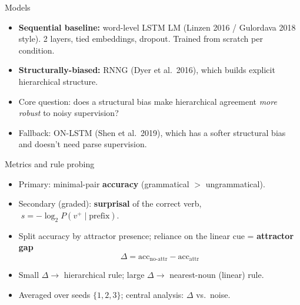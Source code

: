 \begin{frame}{Models}
  \begin{itemize}
    \item \textbf{Sequential baseline:} word-level LSTM LM
          (Linzen 2016 / Gulordava 2018 style). 2 layers, tied embeddings,
          dropout. Trained from scratch per condition.
    \item \textbf{Structurally-biased:} RNNG (Dyer et al.\ 2016),
          which builds explicit hierarchical structure.
    \item Core question: does a structural bias make hierarchical agreement
          \emph{more robust} to noisy supervision?
    \item Fallback: ON-LSTM (Shen et al.\ 2019), which has a softer structural
          bias and doesn't need parse supervision.
  \end{itemize}
\end{frame}

\begin{frame}{Metrics and rule probing}
  \begin{itemize}
    \item Primary: minimal-pair \textbf{accuracy} (grammatical $>$ ungrammatical).
    \item Secondary (graded): \textbf{surprisal} of the correct verb,
          \(\; s = -\log_2 P(v^{+}\mid \text{prefix})\).
    \item Split accuracy by attractor presence; reliance on the linear cue =
          \textbf{attractor gap}
          \[
            \Delta = \text{acc}_{\text{no-attr}} - \text{acc}_{\text{attr}}
          \]
    \item Small $\Delta \to$ hierarchical rule; large $\Delta \to$
          nearest-noun (linear) rule.
    \item Averaged over seeds $\{1,2,3\}$; central analysis: $\Delta$ vs.\ noise.
  \end{itemize}
\end{frame}
